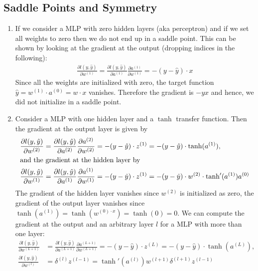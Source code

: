 \documentclass[12pt]{article}
\begin{document}
\subsection{Saddle Points and Symmetry}

\begin{enumerate}
	\item If we consider a MLP with zero hidden layers (aka perceptron) and if we set all weights to zero then we do not end up in a saddle point. This can be shown by looking at the gradient at the output (dropping indices in the following):
	\begin{align}
		\frac{\partial l(y,\hat{y})}{\partial w^{(1)}}= \frac{\partial l(y,\hat{y})}{\partial a^{(1)}} \frac{\partial a^{(1)}}{\partial w^{(1)}} = - ( y - \hat{y} )\cdot x
	\end{align}
	Since all the weights are initialized with zero, the target function $\hat{y} = w^{(1)}\cdot a^{(0)} = w\cdot x$ vanishes. Therefore the gradient is $-yx$ and hence, we did not initialize in a saddle point.
	\item Consider a MLP with one hidden layer and a $\tanh$ transfer function. Then the gradient at the output layer is given by
	\begin{align}
	\frac{\partial l(y,\hat{y})}{\partial w^{(2)}}&= \frac{\partial l(y,\hat{y})}{\partial a^{(2)}}\frac{\partial a^{(2)}}{\partial w^{(2)}} = - ( y - \hat{y} )\cdot z^{(1)} = - ( y - \hat{y} )\cdot \tanh(a^{(1)}), \\
	\intertext{and the gradient at the hidden layer by}
	\frac{\partial l(y,\hat{y})}{\partial w^{(1)}} &= \frac{\partial l(y,\hat{y})}{\partial a^{(1)}} \frac{\partial a^{(1)}}{\partial w^{(1)}}= - ( y - \hat{y} )\cdot z^{(1)} = - ( y - \hat{y} )\cdot w^{(2)}\cdot \tanh'(a^{(1)}) a^{(0)}
	\end{align}
	The gradient of the hidden layer vanishes since $w^{(2)}$ is initialized as zero, the gradient of the output layer vanishes since $\tanh(a^{(1)})=\tanh(w^{(0)\cdot x})=\tanh(0)=0$.
	We can compute the gradient at the output and an arbitrary layer $l$ for a MLP with more than one layer: 
	\begin{align}
		\frac{\partial l(y,\hat{y})}{\partial w^{(L+1)}}&= \frac{\partial l(y,\hat{y})}{\partial a^{(L+1)}}\frac{\partial a^{(L+1)}}{\partial w^{(L+1)}} = - ( y - \hat{y} )\cdot z^{(L)} = - ( y - \hat{y} )\cdot \tanh(a^{(L)}), \label{eq:MLPtop} \\
		\frac{\partial l(y,\hat{y})}{\partial w^{(l)}} &= \delta^{(l)} z^{(l-1)} = \tanh'(a^{(l)})w^{(l+1)}\delta^{(l+1)}z^{(l-1)} \label{MLParbitrary}

\end{align}
\end{enumerate}
\end{document}
